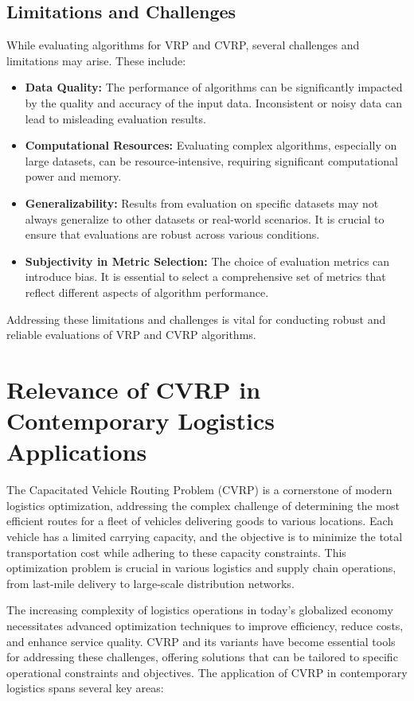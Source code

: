 \documentclass[
]{article}
\begin{document}
\subsection{Limitations and Challenges}
While evaluating algorithms for VRP and CVRP, several challenges and limitations may arise. These include:
\begin{itemize}
  \item \textbf{Data Quality:} The performance of algorithms can be significantly impacted by the quality and accuracy of the input data. Inconsistent or noisy data can lead to misleading evaluation results.
  \item \textbf{Computational Resources:} Evaluating complex algorithms, especially on large datasets, can be resource-intensive, requiring significant computational power and memory.
  \item \textbf{Generalizability:} Results from evaluation on specific datasets may not always generalize to other datasets or real-world scenarios. It is crucial to ensure that evaluations are robust across various conditions.
  \item \textbf{Subjectivity in Metric Selection:} The choice of evaluation metrics can introduce bias. It is essential to select a comprehensive set of metrics that reflect different aspects of algorithm performance.
\end{itemize}
Addressing these limitations and challenges is vital for conducting robust and reliable evaluations of VRP and CVRP algorithms.

\newpage
\section{Relevance of CVRP in Contemporary Logistics Applications}

The Capacitated Vehicle Routing Problem (CVRP) is a cornerstone of modern logistics optimization, addressing the complex challenge of determining the most efficient routes for a fleet of vehicles delivering goods to various locations. Each vehicle has a limited carrying capacity, and the objective is to minimize the total transportation cost while adhering to these capacity constraints. This optimization problem is crucial in various logistics and supply chain operations, from last-mile delivery to large-scale distribution networks.

The increasing complexity of logistics operations in today's globalized economy necessitates advanced optimization techniques to improve efficiency, reduce costs, and enhance service quality. CVRP and its variants have become essential tools for addressing these challenges, offering solutions that can be tailored to specific operational constraints and objectives. The application of CVRP in contemporary logistics spans several key areas:
\end{document}

